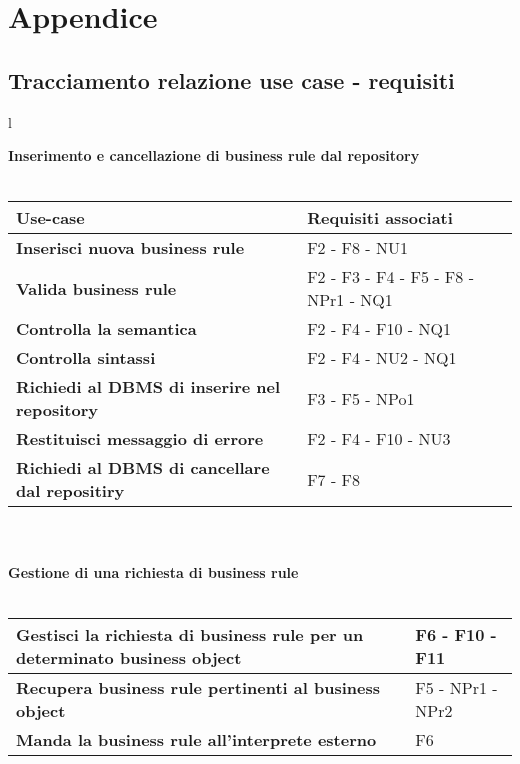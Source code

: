 \chapter{Appendice}
\section{Tracciamento relazione use case - requisiti}
\large{
\begin{tabular}{l}

\textbf{Inserimento e cancellazione di business rule dal repository}\\ \\

\begin{tabular}{||p{8cm}||p{4cm}||} \hline
\textbf{Use-case} & \textbf{Requisiti associati} \\ \hline
\textbf{Inserisci nuova business rule} & F2 - F8 - NU1 \\ \hline
\textbf{Valida business rule} & F2 - F3 - F4 - F5 - F8 - NPr1 - NQ1 \\ \hline
\textbf{Controlla la semantica} & F2 - F4 - F10 - NQ1\\ \hline
\textbf{Controlla sintassi} & F2 - F4 - NU2 - NQ1\\ \hline
\textbf{Richiedi al DBMS di inserire nel repository} & F3 -  F5 -  NPo1 \\ \hline
\textbf{Restituisci messaggio di errore} & F2 - F4 - F10 - NU3 \\ \hline
\textbf{Richiedi al DBMS di cancellare dal repositiry} & F7 - F8 \\ \hline
\end{tabular} \\ \\

\textbf {Gestione di una richiesta di business rule}\\ \\

\begin{tabular}{||p{8cm}||p{4cm}||} \hline
\textbf{Gestisci la richiesta di business rule per un determinato business object} & F6 - F10 - F11 \\ \hline
\textbf{Recupera business rule pertinenti al business object} & F5 - NPr1 - NPr2 \\ \hline
\textbf{Manda la business rule all'interprete esterno} & F6 \\ \hline
\end{tabular} \\
\end{tabular}
}

